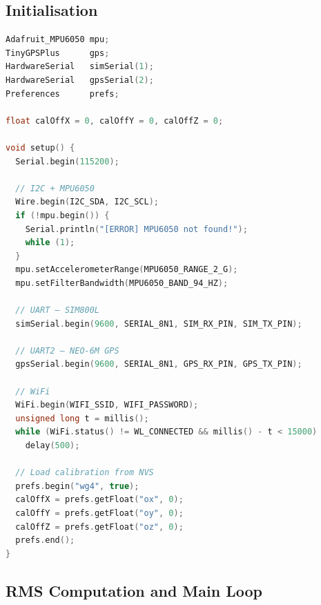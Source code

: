 \subsection{Initialisation}

\begin{lstlisting}[language=C++, caption={Firmware – setup()}]
Adafruit_MPU6050 mpu;
TinyGPSPlus      gps;
HardwareSerial   simSerial(1);
HardwareSerial   gpsSerial(2);
Preferences      prefs;

float calOffX = 0, calOffY = 0, calOffZ = 0;

void setup() {
  Serial.begin(115200);

  // I2C + MPU6050
  Wire.begin(I2C_SDA, I2C_SCL);
  if (!mpu.begin()) {
    Serial.println("[ERROR] MPU6050 not found!");
    while (1);
  }
  mpu.setAccelerometerRange(MPU6050_RANGE_2_G);
  mpu.setFilterBandwidth(MPU6050_BAND_94_HZ);

  // UART – SIM800L
  simSerial.begin(9600, SERIAL_8N1, SIM_RX_PIN, SIM_TX_PIN);

  // UART2 – NEO-6M GPS
  gpsSerial.begin(9600, SERIAL_8N1, GPS_RX_PIN, GPS_TX_PIN);

  // WiFi
  WiFi.begin(WIFI_SSID, WIFI_PASSWORD);
  unsigned long t = millis();
  while (WiFi.status() != WL_CONNECTED && millis() - t < 15000)
    delay(500);

  // Load calibration from NVS
  prefs.begin("wg4", true);
  calOffX = prefs.getFloat("ox", 0);
  calOffY = prefs.getFloat("oy", 0);
  calOffZ = prefs.getFloat("oz", 0);
  prefs.end();
}
\end{lstlisting}

\subsection{RMS Computation and Main Loop}

